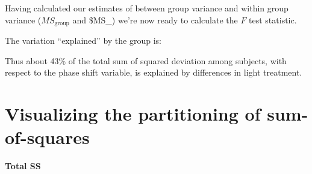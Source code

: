 \documentclass[]{book}
\newenvironment{Shaded}{\begin{snugshade}}{\end{snugshade}}
\newcommand{\CommentTok}[1]{\textcolor[rgb]{0.56,0.35,0.01}{\textit{#1}}}
\newcommand{\NormalTok}[1]{#1}
\newcommand{\OperatorTok}[1]{\textcolor[rgb]{0.81,0.36,0.00}{\textbf{#1}}}
\newcommand{\StringTok}[1]{\textcolor[rgb]{0.31,0.60,0.02}{#1}}
\theoremstyle{definition}
\theoremstyle{definition}
\theoremstyle{definition}
\theoremstyle{remark}
\begin{document}
Having calculated our estimates of between group variance and within
group variance (\(MS_\text{group}\) and \$MS\_) we're now
ready to calculate the \(F\) test statistic.

\begin{Shaded}
\end{Shaded}

The variation ``explained'' by the group is:

\begin{Shaded}
\end{Shaded}

Thus about 43\% of the total sum of squared deviation among subjects,
with respect to the phase shift variable, is explained by differences in
light treatment.

\hypertarget{visualizing-the-partitioning-of-sum-of-squares}{%
\section{Visualizing the partitioning of
sum-of-squares}\label{visualizing-the-partitioning-of-sum-of-squares}}

\textbf{Total SS}
\end{document}
